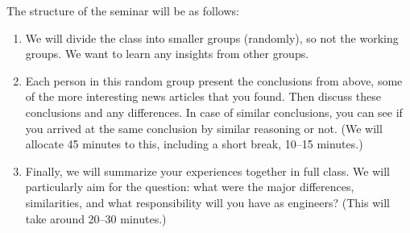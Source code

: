 The structure of the seminar will be as follows:
\begin{frame}
  \begin{enumerate}
    \item We will divide the class into smaller groups (randomly), so not the 
      working groups.
      We want to learn any insights from other groups.

    \item Each person in this random group present the conclusions from above, 
      some of the more interesting news articles that you found.
      Then discuss these conclusions and any differences.
      In case of similar conclusions, you can see if you arrived at the same 
      conclusion by similar reasoning or not.
      (We will allocate 45 minutes to this, including a short break, 10--15 
      minutes.)

    \item Finally, we will summarize your experiences together in full class.
      We will particularly aim for the question: what were the major 
      differences, similarities, and what responsibility will you have as 
      engineers?
      (This will take around 20--30 minutes.)
  \end{enumerate}
\end{frame}



\begin{frame}[allowframebreaks]
  \printbibliography{}
\end{frame}
